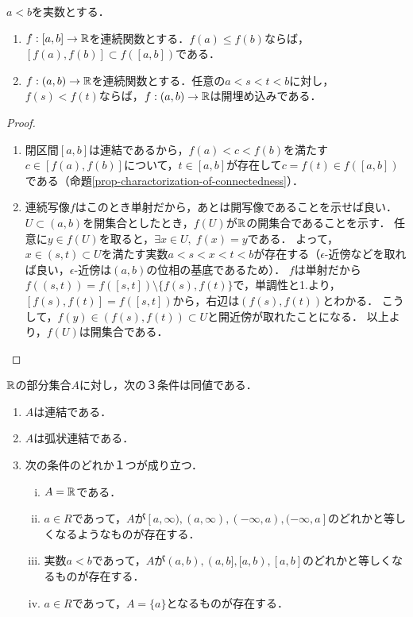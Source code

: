 \documentclass[uplatex,dvipdfmx]{jsreport}
\begin{document}
\begin{corollary}[区間上の単調写像は開埋め込み]\label{cor-monotone-map-over-intervals}
    $a<b$を実数とする．
    \begin{enumerate}
        \item $f:[a,b]\to\mathbb{R}$を連続関数とする．$f(a)\le f(b)$ならば，$[f(a),f(b)]\subset f([a,b])$である．
        \item $f:(a,b)\to\mathbb{R}$を連続関数とする．任意の$a<s<t<b$に対し，$f(s)<f(t)$ならば，$f:(a,b)\to\mathbb{R}$は開埋め込みである．
    \end{enumerate}
\end{corollary}
\begin{proof}\mbox{}
    \begin{enumerate}
        \item 閉区間$[a,b]$は連結であるから，$f(a)<c<f(b)$を満たす$c\in[f(a),f(b)]$について，$t\in[a,b]$が存在して$c=f(t)\in f([a,b])$である（命題\ref{prop-charactorization-of-connectedness}）．
        \item 連続写像$f$はこのとき単射だから，あとは開写像であることを示せば良い．
        $U\subset(a,b)$を開集合としたとき，$f(U)$が$\R$の開集合であることを示す．
        任意に$y\in f(U)$を取ると，$\exists x\in U,\; f(x)=y$である．
        よって，$x\in(s,t)\subset U$を満たす実数$a<s<x<t<b$が存在する（$\epsilon$-近傍などを取れば良い，$\epsilon$-近傍は$(a,b)$の位相の基底であるため）．
        $f$は単射だから$f((s,t))=f([s,t])\setminus\{f(s),f(t)\}$で，単調性と1.より，$[f(s),f(t)]=f([s,t])$から，右辺は$(f(s),f(t))$とわかる．
        こうして，$f(y)\in(f(s),f(t))\subset U$と開近傍が取れたことになる．
        以上より，$f(U)$は開集合である．
    \end{enumerate}
\end{proof}

\begin{proposition}[$\R$の連結集合の分類]
    $\R$の部分集合$A$に対し，次の３条件は同値である．
    \begin{enumerate}
        \item $A$は連結である．
        \item $A$は弧状連結である．
        \item 次の条件のどれか１つが成り立つ．
        \begin{enumerate}[(i)]
            \item $A=\mathbb{R}$である．
            \item $a\in R$であって，$A$が$[a,\infty),(a,\infty),(-\infty,a),(-\infty,a]$のどれかと等しくなるようなものが存在する．
            \item 実数$a<b$であって，$A$が$(a,b),(a,b],[a,b),[a,b]$のどれかと等しくなるものが存在する．
            \item $a\in R$であって，$A=\{a\}$となるものが存在する．
        \end{enumerate}
    \end{enumerate}
\end{proposition}
\end{document}
